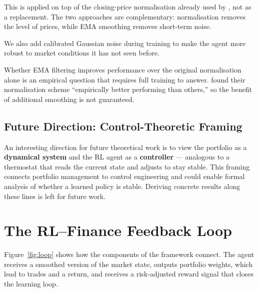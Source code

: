 \documentclass[12pt,a4paper]{article}
\begin{document}
This is applied on top of the closing-price normalisation already used
by \citet{jiang2017deep}, not as a replacement. The two approaches are
complementary: normalisation removes the level of prices, while EMA
smoothing removes short-term noise.

We also add calibrated Gaussian noise during training to make the agent
more robust to market conditions it has not seen before.

\begin{tcolorbox}[limitstyle]
Whether EMA filtering improves performance over the original
normalisation alone is an empirical question that requires full
training to answer. \citet{jiang2017deep} found their normalisation
scheme ``empirically better performing than others,'' so the benefit
of additional smoothing is not guaranteed.
\end{tcolorbox}

\subsection*{Future Direction: Control-Theoretic Framing}

An interesting direction for future theoretical work is to view the
portfolio as a \textbf{dynamical system} and the RL agent as a
\textbf{controller} --- analogous to a thermostat that reads the
current state and adjusts to stay stable. This framing connects
portfolio management to control engineering and could enable formal
analysis of whether a learned policy is stable. Deriving concrete
results along these lines is left for future work.

\section{The RL--Finance Feedback Loop}

Figure~\ref{fig:loop} shows how the components of the framework
connect. The agent receives a smoothed version of the market state,
outputs portfolio weights, which lead to trades and a return, and
receives a risk-adjusted reward signal that closes the learning loop.
\end{document}
